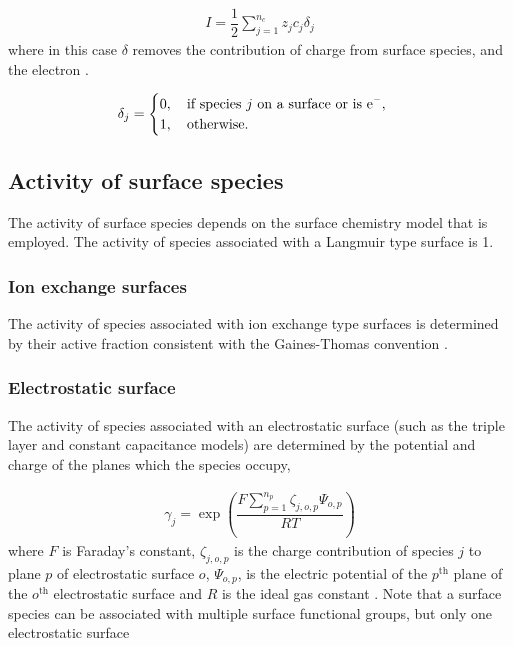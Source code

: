 \documentclass{article}
\begin{document}
\begin{align}
    I = \dfrac{1}{2}\sum_{j=1}^{n_c} z_j c_j \delta_j
\end{align}
where in this case $\delta$ removes the contribution of charge from surface species, and the electron .

\begin{align}
\delta_j = \begin{cases}
0, \quad\text{if species $j$ on a surface or is \ce{e-}},\\
1, \quad\text{otherwise}.
\end{cases}
\end{align}

\subsection{Activity of surface species}
The activity of surface species depends on the surface chemistry model that is employed. The activity of species associated with a Langmuir type surface is 1.

\subsubsection{Ion exchange surfaces}
The activity of species associated with ion exchange type surfaces is determined by their active fraction consistent with the Gaines-Thomas convention \cite{gaines1953}{}.

\subsubsection{Electrostatic surface}
The activity of species associated with an electrostatic surface (such as the triple layer and constant capacitance models) are determined by the potential and charge of the planes which the species occupy, 

\begin{align}
    \gamma_j = \exp\left(\dfrac{F\sum_{p=1}^{n_p}\zeta_{j,o,p}\Psi_{o,p}}{RT}\right)\label{eq:surfAct}
\end{align}
where $F$ is Faraday's constant, $\zeta_{j,o,p}$ is the charge contribution of species $j$ to plane $p$ of electrostatic surface $o$, $\Psi_{o,p}$, is the electric potential of the $p^\text{th}$ plane of the $o^\text{th}$ electrostatic surface and $R$ is the ideal gas constant \cite{Hiemstra1989a}{}. Note that a surface species can be associated with multiple surface functional groups, but only one electrostatic surface
\end{document}
